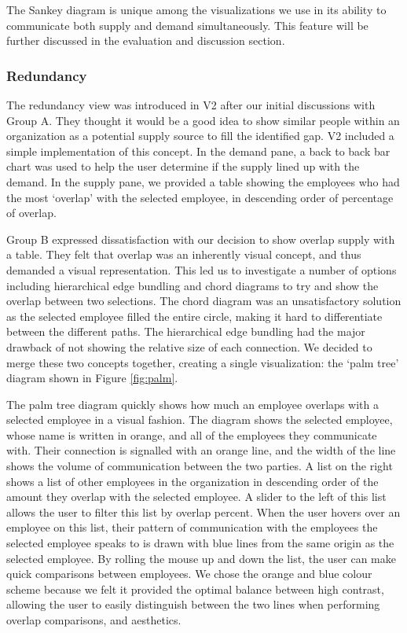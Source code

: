 \documentclass[journal]{vgtc}                %
\begin{document}
The Sankey diagram is unique among the visualizations we use in its ability to communicate both supply and demand simultaneously. This feature will be further discussed in the evaluation and discussion section.

\subsubsection{Redundancy}

The redundancy view was introduced in V2 after our initial discussions with Group A.  They thought it would be a good idea to show similar people within an organization as a potential supply source to fill the identified gap. V2 included a simple implementation of this concept. In the demand pane, a back to back bar chart was used to help the user determine if the supply lined up with the demand. In the supply pane, we provided a table showing the employees who had the most \lq overlap\rq{} with the selected employee, in descending order of percentage of overlap.

Group B expressed dissatisfaction with our decision to show overlap supply with a table. They felt that overlap was an inherently visual concept, and thus demanded a visual representation. This led us to investigate a number of options including hierarchical edge bundling and chord diagrams to try and show the overlap between two selections.  The chord diagram was an unsatisfactory solution as the selected employee filled the entire circle, making it hard to differentiate between the different paths.  The hierarchical edge bundling had the major drawback of not showing the relative size of each connection.  We decided to merge these two concepts together, creating a single visualization: the \lq palm tree\rq{} diagram shown in Figure \ref{fig:palm}.

The palm tree diagram quickly shows how much an employee overlaps with a selected employee in a visual fashion. The diagram shows the selected employee, whose name is written in orange, and all of the employees they communicate with. Their connection is signalled with an orange line, and the width of the line shows the volume of communication between the two parties. A list on the right shows a list of other employees in the organization in descending order of the amount they overlap with the selected employee. A slider to the left of this list allows the user to filter this list by overlap percent. When the user hovers over an employee on this list, their pattern of communication with the employees the selected employee speaks to is drawn with blue lines from the same origin as the selected employee. By rolling the mouse up and down the list, the user can make quick comparisons between employees. We chose the orange and blue colour scheme because we felt it provided the optimal balance between high contrast, allowing the user to easily distinguish between the two lines when performing overlap comparisons, and aesthetics. 
\end{document}
